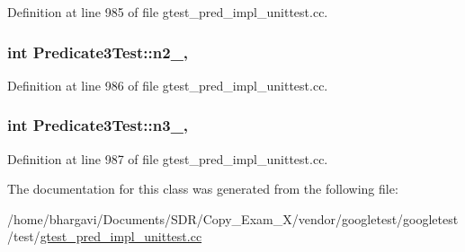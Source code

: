 Definition at line 985 of file gtest\+\_\+pred\+\_\+impl\+\_\+unittest.\+cc.

\subsubsection[{\texorpdfstring{n2\+\_\+}{n2_}}]{\setlength{\rightskip}{0pt plus 5cm}int Predicate3\+Test\+::n2\+\_\+\hspace{0.3cm}{\ttfamily [static]}, {\ttfamily [protected]}}\hypertarget{class_predicate3_test_a11049ef16bcaadc8262faf7349c7676e}{}\label{class_predicate3_test_a11049ef16bcaadc8262faf7349c7676e}


Definition at line 986 of file gtest\+\_\+pred\+\_\+impl\+\_\+unittest.\+cc.

\subsubsection[{\texorpdfstring{n3\+\_\+}{n3_}}]{\setlength{\rightskip}{0pt plus 5cm}int Predicate3\+Test\+::n3\+\_\+\hspace{0.3cm}{\ttfamily [static]}, {\ttfamily [protected]}}\hypertarget{class_predicate3_test_afc1df6b079ffe22b87479b161d2ad2f7}{}\label{class_predicate3_test_afc1df6b079ffe22b87479b161d2ad2f7}


Definition at line 987 of file gtest\+\_\+pred\+\_\+impl\+\_\+unittest.\+cc.



The documentation for this class was generated from the following file\+:\begin{DoxyCompactItemize}
\item 
/home/bhargavi/\+Documents/\+S\+D\+R/\+Copy\+\_\+\+Exam\+\_\+X/vendor/googletest/googletest/test/\hyperlink{gtest__pred__impl__unittest_8cc}{gtest\+\_\+pred\+\_\+impl\+\_\+unittest.\+cc}\end{DoxyCompactItemize}
